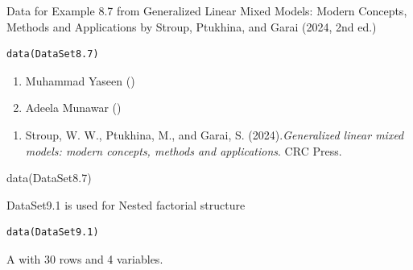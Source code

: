 \documentclass[a4paper]{book}
\begin{document}
%
\begin{Description}
Data for Example 8.7 from Generalized Linear Mixed Models: Modern Concepts, Methods and Applications by Stroup, Ptukhina, and Garai (2024, 2nd ed.)
\end{Description}
%
\begin{Usage}
\begin{verbatim}
data(DataSet8.7)
\end{verbatim}
\end{Usage}
%
\begin{Author}
\begin{enumerate}

\item{}  Muhammad Yaseen ()
\item{} Adeela Munawar ()

\end{enumerate}

\end{Author}
%
\begin{References}
\begin{enumerate}

\item{} Stroup, W. W., Ptukhina, M., and Garai, S. (2024).\emph{Generalized linear mixed models: modern concepts, methods and applications}.
CRC Press.

\end{enumerate}

\end{References}
%
\begin{Examples}
\begin{ExampleCode}
data(DataSet8.7)
\end{ExampleCode}
\end{Examples}
%
\begin{Description}
DataSet9.1 is used for Nested factorial structure
\end{Description}
%
\begin{Usage}
\begin{verbatim}
data(DataSet9.1)
\end{verbatim}
\end{Usage}
%
\begin{Format}
A  with 30 rows and 4 variables.
\end{Format}
\end{document}

